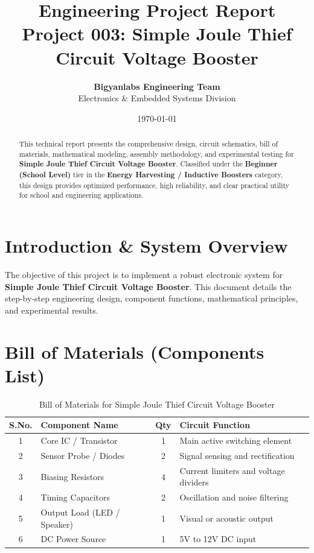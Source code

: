 \documentclass[11pt,a4paper]{article}
\title{\textbf{\Huge Engineering Project Report}\\[0.5em] \Large Project 003: Simple Joule Thief Circuit Voltage Booster}
\author{\textbf{Bigyanlabs Engineering Team}\\ Electronics \& Embedded Systems Division}
\date{\today}
\begin{document}
\maketitle
\thispagestyle{empty}

\begin{abstract}
This technical report presents the comprehensive design, circuit schematics, bill of materials, mathematical modeling, assembly methodology, and experimental testing for \textbf{Simple Joule Thief Circuit Voltage Booster}. Classified under the \textbf{Beginner (School Level)} tier in the \textbf{Energy Harvesting / Inductive Boosters} category, this design provides optimized performance, high reliability, and clear practical utility for school and engineering applications.
\end{abstract}

\newpage
\tableofcontents
\newpage

\section{Introduction \& System Overview}
The objective of this project is to implement a robust electronic system for \textbf{Simple Joule Thief Circuit Voltage Booster}. This document details the step-by-step engineering design, component functions, mathematical principles, and experimental results.

\section{Bill of Materials (Components List)}
\begin{table}[h!]
\centering
\caption{Bill of Materials for Simple Joule Thief Circuit Voltage Booster}
\vspace{0.5em}
\begin{tabular}{clcp{7cm}}
\toprule
\textbf{S.No.} & \textbf{Component Name} & \textbf{Qty} & \textbf{Circuit Function} \\
\midrule
1 & Core IC / Transistor & 1 & Main active switching element \\
2 & Sensor Probe / Diodes & 2 & Signal sensing and rectification \\
3 & Biasing Resistors & 4 & Current limiters and voltage dividers \\
4 & Timing Capacitors & 2 & Oscillation and noise filtering \\
5 & Output Load (LED / Speaker) & 1 & Visual or acoustic output \\
6 & DC Power Source & 1 & 5V to 12V DC input \\
\bottomrule
\end{tabular}
\end{table}
\end{document}
